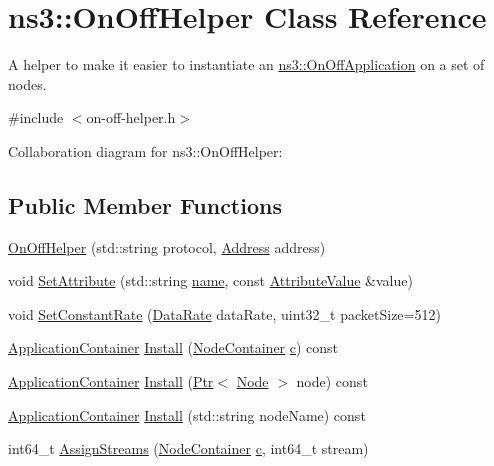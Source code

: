 \hypertarget{classns3_1_1OnOffHelper}{}\section{ns3\+:\+:On\+Off\+Helper Class Reference}
\label{classns3_1_1OnOffHelper}


A helper to make it easier to instantiate an \hyperlink{classns3_1_1OnOffApplication}{ns3\+::\+On\+Off\+Application} on a set of nodes.  




{\ttfamily \#include $<$on-\/off-\/helper.\+h$>$}



Collaboration diagram for ns3\+:\+:On\+Off\+Helper\+:
\subsection*{Public Member Functions}
\begin{DoxyCompactItemize}
\item 
\hyperlink{classns3_1_1OnOffHelper_a4288a3cf8b5e4b41eb513a226b948fc6}{On\+Off\+Helper} (std\+::string protocol, \hyperlink{classns3_1_1Address}{Address} address)
\item 
void \hyperlink{classns3_1_1OnOffHelper_a9f29b8db5fd9afa3075a74f48d30d914}{Set\+Attribute} (std\+::string \hyperlink{generate__test__data__lte__spectrum__model_8m_ab74e6bf80237ddc4109968cedc58c151}{name}, const \hyperlink{classns3_1_1AttributeValue}{Attribute\+Value} \&value)
\item 
void \hyperlink{classns3_1_1OnOffHelper_a73526acef24a4559fb50db9f7c1c10ef}{Set\+Constant\+Rate} (\hyperlink{classns3_1_1DataRate}{Data\+Rate} data\+Rate, uint32\+\_\+t packet\+Size=512)
\item 
\hyperlink{classns3_1_1ApplicationContainer}{Application\+Container} \hyperlink{classns3_1_1OnOffHelper_aa4471e2fec7b08ad7c46aa568f424323}{Install} (\hyperlink{classns3_1_1NodeContainer}{Node\+Container} \hyperlink{mmwave_2model_2fading-traces_2fading__trace__generator_8m_ae0323a9039add2978bf5b49550572c7c}{c}) const 
\item 
\hyperlink{classns3_1_1ApplicationContainer}{Application\+Container} \hyperlink{classns3_1_1OnOffHelper_a2035ac4d23a003859fae0f3c3223cb84}{Install} (\hyperlink{classns3_1_1Ptr}{Ptr}$<$ \hyperlink{classns3_1_1Node}{Node} $>$ node) const 
\item 
\hyperlink{classns3_1_1ApplicationContainer}{Application\+Container} \hyperlink{classns3_1_1OnOffHelper_a28dbb176153f5bbb0c67063999777977}{Install} (std\+::string node\+Name) const 
\item 
int64\+\_\+t \hyperlink{classns3_1_1OnOffHelper_a85670455fe0522c2040fbdddb6d4d1fb}{Assign\+Streams} (\hyperlink{classns3_1_1NodeContainer}{Node\+Container} \hyperlink{mmwave_2model_2fading-traces_2fading__trace__generator_8m_ae0323a9039add2978bf5b49550572c7c}{c}, int64\+\_\+t stream)
\end{DoxyCompactItemize}
